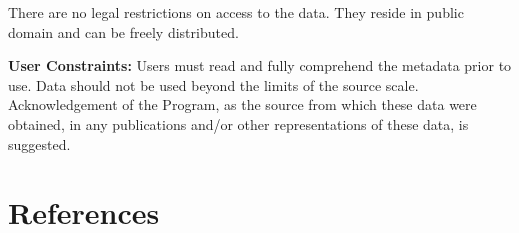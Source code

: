 \documentclass[
  letterpaper,
  oneside,
  open=any]{scrbook}
\newlength{\cslhangindent}
\newlength{\cslentryspacingunit} %
\newenvironment{CSLReferences}[2] %
 {%
  \setlength{\parindent}{0pt}
  \ifodd #1
  \let\oldpar\par
  \def\par{\hangindent=\cslhangindent\oldpar}
  \fi
  \setlength{\parskip}{#2\cslentryspacingunit}
 }%
 {}
\begin{document}
There are no legal restrictions on access to the data. They reside in
public domain and can be freely distributed.

\textbf{User Constraints:} Users must read and fully comprehend the
metadata prior to use. Data should not be used beyond the limits of the
source scale. Acknowledgement of the Program, as the source from which
these data were obtained, in any publications and/or other
representations of these data, is suggested.

\hypertarget{references}{%
\chapter{References}\label{references}}

\hypertarget{refs}{}
\begin{CSLReferences}{0}{0}
\end{CSLReferences}


\backmatter
\end{document}
